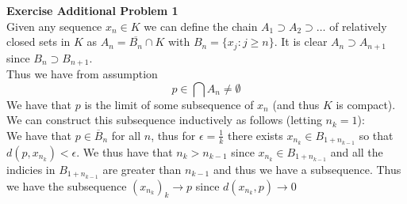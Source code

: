 \documentclass[12pt]{article}
\newenvironment{ques}[1]{\textbf{Exercise #1}\vspace{1 mm}\\ }{\bigskip}
\theoremstyle{definition}
\begin{document}
\begin{ques}{Additional Problem 1}
	Given any sequence $x_n \in K$ we can define the chain $A_1 \supset A_2
	\supset \dots $ of relatively closed sets in $K$ as $A_n = \overline{B_n}
	\cap K$ with $B_n = \{x_j: j \geq n\}$. It is clear $A_n \supset A_{n+1}$
	since $B_n \supset B_{n+1}$.\\
	Thus we have from assumption
	$$p \in \bigcap A_n \neq \emptyset$$
	We have that $p$ is the limit of some subsequence of $x_n$ (and thus $K$ is
	compact). We can
	construct this subsequence inductively as follows (letting $n_k =1$):\\
	We  have that $p \in \overline B_n$ for all $n$, thus for $\epsilon = 
	\frac{1}{k}$ there exists $x_{n_k} \in B_{1 + n_{k - 1}}$ so that $d(p,x_{n_k}) <
	\epsilon$. We thus have that $n_k > n_{k-1}$ since $x_{n_k} \in B_{1 +
	n_{k-1}}$ and all the indicies in $B_{1 + n_{k-1}}$ are greater than
	$n_{k-1}$ and thus we have a subsequence. Thus we have the
	subsequence $(x_{n_k})_k \to p$ since
	$d(x_{n_k}, p) \to 0$
\end{ques}
\end{document}
